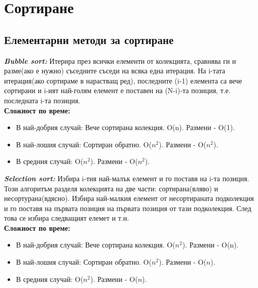 \documentclass[11pt]{article} %
\newcommand{\italicBold}[1]{\textbf{\emph{#1}}}
\begin{document}
\section{Сортиране}
\subsection{Елементарни методи за сортиране}
\italicBold{Bubble sort: }
Итерира през всички елементи от колекцията, сравнява ги и разме(ако е нужно) съседните съседи на всяка една итерация. На i-тата итерация(ако сортираме в нарастващ ред), последните (i-1) елемента са вече сортирани и i-ият най-голям елемент е поставен на (N-i)-та позиция, т.е. последната i-та позиция.\\
\textbf{Сложност по време: }
\begin{itemize}[noitemsep]
	\item В най-добрия случай: Вече сортирана колекция. O(n). Размени - O(1).
	\item В най-лошия случай: Сортиран обратно. O($n^{2}$). Размени - O($n^{2}$).
	\item В средния случай: O($n^{2}$). Размени - O($n^{2}$).\\\par
\end{itemize} 

\italicBold{Selection sort: }
Избира i-тия най-малък елемент и го поставя на i-та позиция. Този алгоритъм разделя колекцията на две части: сортирана(вляво) и несортурана(вдясно). Избира най-малкия елемент от несортираната подколекция и го поставя на първата позиция на първата позиция от тази подколекция. След това се избира следващият елемет и т.н.
\\
\textbf{Сложност по време: }
\begin{itemize}[noitemsep]
	\item В най-добрия случай: Вече сортирана колекция. O($n^2$). Размени - O(n).
	\item В най-лошия случай: Сортиран обратно. O($n^{2}$). Размени - O($n$).
	\item В средния случай: O($n^{2}$). Размени - O($n$).\\\par
\end{itemize}
\end{document}
